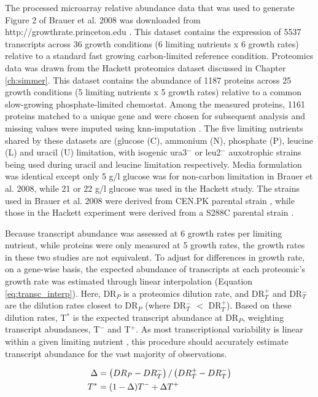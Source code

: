 The processed microarray relative abundance data that was used to generate Figure 2 of Brauer et al. 2008 was downloaded from http://growthrate.princeton.edu \cite{Brauer:2008jn}.  This dataset contains the expression of 5537 transcripts across 36 growth conditions (6 limiting nutrients x 6 growth rates) relative to a standard fast growing carbon-limited reference condition. Proteomics data was drawn from the Hackett proteomics dataset discussed in Chapter \ref{ch:simmer}. This dataset contains the abundance of 1187 proteins across 25 growth conditions (5 limiting nutrients x 5 growth rates) relative to a common slow-growing phosphate-limited chemostat. Among the measured proteins, 1161 proteins matched to a unique gene and were chosen for subsequent analysis and missing values were imputed using knn-imputation \cite{Troyanskaya:2001uh}. The five limiting nutrients shared by these datasets are (glucose (C), ammonium (N), phosphate (P), leucine (L) and uracil (U) limitation, with isogenic ura3$^{-}$ or leu2$^{-}$ auxotrophic strains being used during uracil and leucine limitation respectively. Media formulation was identical except only 5 g/l glucose was for non-carbon limitation in Brauer et al. 2008, while 21 or 22 g/l glucose was used in the Hackett study. The strains used in Brauer et al. 2008 were derived from CEN.PK parental strain \cite{vanDijkenJP:2000er}, while those in the Hackett experiment were derived from a S288C parental strain \cite{Winston:1995io}.

Because transcript abundance was assessed at 6 growth rates per limiting nutrient, while proteins were only measured at 5 growth rates, the growth rates in these two studies are not equivalent. To adjust for differences in growth rate, on a gene-wise basis, the expected abundance of transcripts at each proteomic's growth rate was estimated through linear interpolation (Equation \ref{eq:transc_interp}). Here, DR$_{P}$ is a proteomics dilution rate, and DR$_{T}^{+}$ and DR$_{T}^{-}$ are the dilution rates closest to DR$_{P}$ (where DR$_{T}^{-}$ $<$ DR$_{T}^{+}$). Based on these dilution rates, T$^{*}$ is the expected transcript abundance at DR$_{P}$, weighting transcript abundances, T$^{-}$ and T$^{+}$. As most transcriptional variability is linear within a given limiting nutrient \cite{Brauer:2008jn}, this procedure should accurately estimate transcript abundance for the vast majority of observations. 

\begin{align}
\Delta &= \left(DR_{P} - DR_{T}^{-}\right) / \left(DR_{T}^{+} - DR_{T}^{-}\right)\notag\\
T^{*} &= (1-\Delta)T^{-} + \Delta T^{+}\label{eq:transc_interp}
\end{align}

